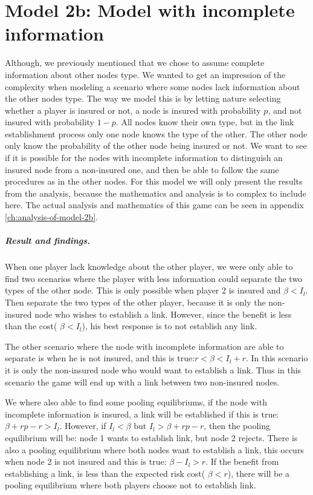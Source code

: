 \section{Model 2b: Model with incomplete information}
\label{Model with incomplete information}
Although, we previously mentioned that we chose to assume complete information about other nodes type. We wanted to get an impression of the complexity when modeling a scenario where some nodes lack information about the other nodes type. The way we model this is by letting nature selecting whether a player is insured or not, a node is insured with probability $p$, and not insured with probability $1-p$. 
All nodes know their own type, but in the link establishment process only one node knows the type of the other. The other node only know the probability of the other node being insured or not. 
We want to see if it is possible for the nodes with incomplete information to distinguish an insured node from a non-insured one, and then be able to follow the same procedures as in the other nodes. 
For this model we will only present the results from the analysis, because the mathematics and analysis is to complex to include here. The actual analysis and mathematics of this game can be seen in appendix \ref{ch:analysis-of-model-2b}.

\subparagraph{Result and findings.}
When one player lack knowledge about the other player, we were only able to find two scenarios where the player with less information could separate the two types of the other node. This is only possible when player 2 is insured and $\beta<I_{l}$. Then separate the two types of the other player, because it is only the non-insured node who wishes to establish a link. However, since the benefit is less than the cost( $\beta<I_{l}$), his best response is to not establish any link.

The other scenario where the node with incomplete information are able to separate is when he is not insured, and this is true:$r<\beta<I_{l}+r$. In this scenario it is only the non-insured node who would want to establish a link. Thus in this scenario the game will end up with a link between two non-insured nodes.

We where also able to find some pooling equilibriums, if the node with incomplete information is insured, a link will be established if this is true: $\beta+rp-r>I_{l}$. However, if $I_{l}<\beta \text{ but } I_{l}>\beta+rp-r$, then the pooling equilibrium will be: node 1 wants to establish link, but node 2 rejects.
There is also a pooling equilibrium where both nodes want to establish a link, this occurs when node 2 is not insured and this is true: $\beta-I_{l}>r$. If the benefit from establishing a link, is less than the expected risk cost( $\beta<r$), there will be a pooling equilibrium where both players choose not to establish link. 

